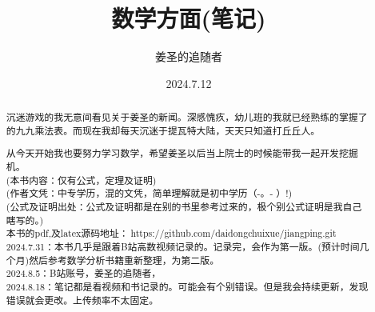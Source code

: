 \title{数学方面(笔记)} %
\author{姜圣的追随者}  %
\date{2024.7.12} %

\maketitle %
\newpage
\begin{abstract}
    沉迷游戏的我无意间看见关于姜圣的新闻。深感愧疚，幼儿班的我就已经熟练的掌握了的九九乘法表。而现在我却每天沉迷于提瓦特大陆，天天只知道打丘丘人。\par 从今天开始我也要努力学习数学，希望姜圣以后当上院士的时候能带我一起开发挖掘机。
    \\(本书内容：仅有公式，定理及证明)
    \\(作者文凭：中专学历，混的文凭，简单理解就是初中学历（-。- ）!)
    \\(公式及证明出处：公式及证明都是在别的书里参考过来的，极个别公式证明是我自己瞎写的。)
    \\本书的pdf,及latex源码地址：\faGithub $\ $https://github.com/daidongchuixue/jiangping.git
    \\2024.7.31：本书几乎是跟着B站高数视频记录的。记录完，会作为第一版。(预计时间几个月)然后参考数学分析书籍重新整理，为第二版。
    \\2024.8.5：B站账号，姜圣的追随者，
    \\2024.8.18：笔记都是看视频和书记录的。可能会有个别错误。但是我会持续更新，发现错误就会更改。上传频率不太固定。
\end{abstract}
\newpage
\renewcommand{\contentsname}{\begin{center}目录\end{center} }
\tableofcontents %



